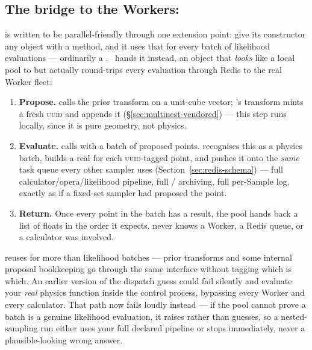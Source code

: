 \subsection{The bridge to the Workers: }
\label{sec:multinest-pool}

 is written to be parallel-friendly through one extension point: give
its constructor any object with a  method, and it uses that
for every batch of likelihood evaluations --- ordinarily a
. \Jtwo\ hands it  instead, an
object that \emph{looks} like a local pool to  but actually round-trips
every evaluation through Redis to the real Worker fleet:

\begin{enumerate}
  \item \textbf{Propose.}  calls the prior transform on a unit-cube
        vector; \Jtwo's transform mints a fresh \textsc{uuid} and appends it
        (\S\ref{sec:multinest-vendored}) --- this step runs locally, since it is pure
        geometry, not physics.
  \item \textbf{Evaluate.}  calls  with a batch of
        proposed points.  recognises this as a physics
        batch, builds a real  for each \textsc{uuid}-tagged point, and
        pushes it onto the \emph{same} task queue every other sampler uses
        (Section~\ref{sec:redis-schema}) --- full calculator/opera/likelihood
        pipeline, full  /  archiving, full per-Sample
        log, exactly as if a fixed-set sampler had proposed the point.
  \item \textbf{Return.} Once every point in the batch has a result, the pool hands
         back a list of floats in the order it expects. 
        never knows a Worker, a Redis queue, or a calculator was involved.
\end{enumerate}

\begin{jwarn}
 reuses  for more than likelihood batches --- prior
transforms and some internal proposal bookkeeping go through the same interface
without tagging which is which. An earlier version of the dispatch guess could fail
silently and evaluate your \emph{real} physics function inside the control process,
bypassing every Worker and every calculator. That path now fails loudly instead ---
if the pool cannot prove a batch is a genuine likelihood evaluation, it raises rather
than guesses, so a nested-sampling run either uses your full declared pipeline or
stops immediately, never a plausible-looking wrong answer.
\end{jwarn}

